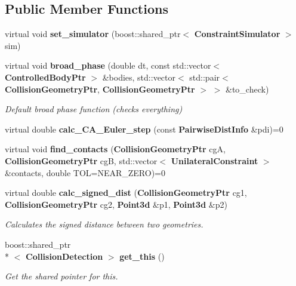 \subsection*{Public Member Functions}
\begin{DoxyCompactItemize}
\item 
virtual void {\bfseries set\-\_\-simulator} (boost\-::shared\-\_\-ptr$<$ {\bf Constraint\-Simulator} $>$ sim)\label{classMoby_1_1CollisionDetection_a350e6e1a15595c8bdeda20162e93f076}

\item 
virtual void {\bf broad\-\_\-phase} (double dt, const std\-::vector$<$ {\bf Controlled\-Body\-Ptr} $>$ \&bodies, std\-::vector$<$ std\-::pair$<$ {\bf Collision\-Geometry\-Ptr}, {\bf Collision\-Geometry\-Ptr} $>$ $>$ \&to\-\_\-check)\label{classMoby_1_1CollisionDetection_a2e765b0e2d5b70d6ecf64cb20b2b05d6}

\begin{DoxyCompactList}\small\item\em Default broad phase function (checks everything) \end{DoxyCompactList}\item 
virtual double {\bfseries calc\-\_\-\-C\-A\-\_\-\-Euler\-\_\-step} (const {\bf Pairwise\-Dist\-Info} \&pdi)=0\label{classMoby_1_1CollisionDetection_adb6263442eb74a5351f52a7531b3335a}

\item 
virtual void {\bfseries find\-\_\-contacts} ({\bf Collision\-Geometry\-Ptr} cg\-A, {\bf Collision\-Geometry\-Ptr} cg\-B, std\-::vector$<$ {\bf Unilateral\-Constraint} $>$ \&contacts, double T\-O\-L=N\-E\-A\-R\-\_\-\-Z\-E\-R\-O)=0\label{classMoby_1_1CollisionDetection_a52baefb4b903c5aae59d87830a783533}

\item 
virtual double {\bf calc\-\_\-signed\-\_\-dist} ({\bf Collision\-Geometry\-Ptr} cg1, {\bf Collision\-Geometry\-Ptr} cg2, {\bf Point3d} \&p1, {\bf Point3d} \&p2)\label{classMoby_1_1CollisionDetection_add483854d989e80029d1986bc2976d47}

\begin{DoxyCompactList}\small\item\em Calculates the signed distance between two geometries. \end{DoxyCompactList}\item 
boost\-::shared\-\_\-ptr\\*
$<$ {\bf Collision\-Detection} $>$ {\bf get\-\_\-this} ()\label{classMoby_1_1CollisionDetection_aeaa818a81ebbe2065c8f31731e170bea}

\begin{DoxyCompactList}\small\item\em Get the shared pointer for this. \end{DoxyCompactList}\end{DoxyCompactItemize}
